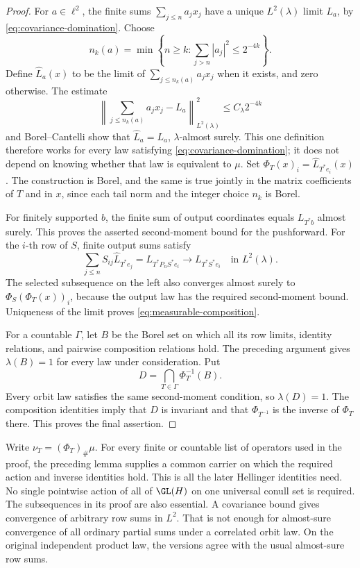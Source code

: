 \begin{proof}
For \(a\in\ell^2\), the finite sums \(\sum_{j\leq n}a_jx_j\) have a
unique \(L^2(\lambda)\) limit \(L_a\), by
\eqref{eq:covariance-domination}.  Choose
\[
  n_k(a)=\min\left\{n\geq k:
                \sum_{j>n}|a_j|^2\leq2^{-4k}\right\}.
\]
Define \(\widehat L_a(x)\) to be the limit of
\(\sum_{j\leq n_k(a)}a_jx_j\) when it exists, and zero otherwise.
The estimate
\[
  \left\|\sum_{j\leq n_k(a)}a_jx_j-L_a\right\|_{L^2(\lambda)}^2
  \leq C_\lambda2^{-4k}
\]
and Borel--Cantelli show that \(\widehat L_a=L_a\),
\(\lambda\)-almost surely.  This one definition therefore works for every
law satisfying \eqref{eq:covariance-domination}; it does not depend on
knowing whether that law is equivalent to \(\mu\).  Set
\(\Phi_T(x)_i=\widehat L_{T^*e_i}(x)\).  The construction is Borel,
and the same is true jointly in the matrix coefficients of \(T\) and in
\(x\), since each tail norm and the integer choice \(n_k\) is Borel.

For finitely supported \(b\), the finite sum of output coordinates equals
\(L_{T^*b}\) almost surely.  This proves the asserted second-moment bound
for the pushforward.  For the \(i\)-th row of \(S\), finite output sums
satisfy
\[
  \sum_{j\leq n}S_{ij}\widehat L_{T^*e_j}
     =L_{T^*P_nS^*e_i}
     \longrightarrow L_{T^*S^*e_i}
     \quad\text{in }L^2(\lambda).
\]
The selected subsequence on the left also converges almost surely to
\(\Phi_S(\Phi_T(x))_i\), because the output law has the required
second-moment bound.  Uniqueness of the limit proves
\eqref{eq:measurable-composition}.

For a countable \(\Gamma\), let \(B\) be the Borel set on which all its
row limits, identity relations, and pairwise composition relations hold.
The preceding argument gives \(\lambda(B)=1\) for every law under
consideration.  Put
\[
  D=\bigcap_{T\in\Gamma}\Phi_T^{-1}(B).
\]
Every orbit law satisfies the same second-moment condition, so
\(\lambda(D)=1\).  The composition identities imply that
\(D\) is invariant and that \(\Phi_{T^{-1}}\) is the inverse of
\(\Phi_T\) there.  This proves the final assertion.
\end{proof}

Write \(\nu_T=(\Phi_T)_\#\mu\).
For every finite or countable list of operators used in the proof, the
preceding lemma supplies a common carrier on which the required action and
inverse identities hold.
This is all the later Hellinger identities need.
No single pointwise action of all of \(\GL(H)\) on one universal conull set
is required.
The subsequences in its proof are also essential.
A covariance bound gives convergence of arbitrary row sums in \(L^2\).
That is not enough for almost-sure convergence of all ordinary partial sums
under a correlated orbit law.
On the original independent product law, the versions agree with the usual
almost-sure row sums.

